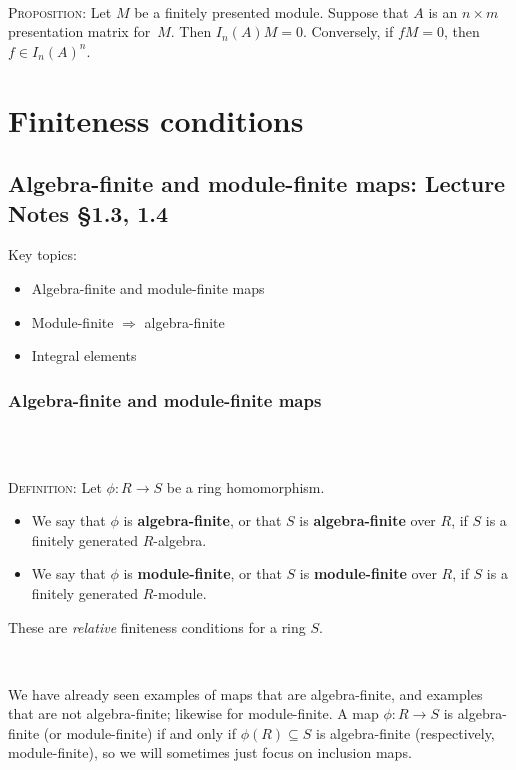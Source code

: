 \documentclass[12pt]{amsart}
\newcommand{\0}{$\phantom{.}$}
\newcommand{\1}{\mathbbm{1}}
\newcommand{\sssec}[1]{\subsubsection*{#1}}
\begin{document}
\



\noindent \textsc{Proposition:} Let $M$ be a finitely presented module. Suppose that $A$ is an $n\times m$ presentation matrix for~$M$. Then $I_n(A) M = 0$. Conversely, if $f M=0$, then $f\in I_n(A)^n$.


\newpage

\section{Finiteness conditions}
\setcounter{subsection}{5}

\subsection{Algebra-finite and module-finite maps:  Lecture Notes \S1.3, 1.4}

\begin{framed} Key topics:
\begin{itemize}
\item Algebra-finite and module-finite maps
\item Module-finite $\Longrightarrow$ algebra-finite
\item Integral elements
\end{itemize}
\end{framed}

\sssec{Algebra-finite and module-finite maps} \0

\

\noindent \textsc{Definition:} Let $\phi:R \to S$ be a ring homomorphism.
\begin{itemize}[leftmargin=*]

\item We say that $\phi$ is \textbf{algebra-finite}, or that $S$ is \textbf{algebra-finite} over $R$, if $S$ is a finitely generated $R$-algebra.
\item We say that $\phi$ is  \textbf{module-finite}, or that $S$ is \textbf{module-finite} over $R$, if $S$ is a finitely generated $R$-module.
\end{itemize}These are \emph{relative} finiteness conditions for a ring $S$.

\

\noindent We have already seen examples of maps that are algebra-finite, and examples that are not algebra-finite; likewise for module-finite. A map $\phi:R\to S$ is algebra-finite (or module-finite) if and only if $\phi(R) \subseteq S$ is algebra-finite (respectively, module-finite), so we will sometimes just focus on inclusion maps.
\end{document}
